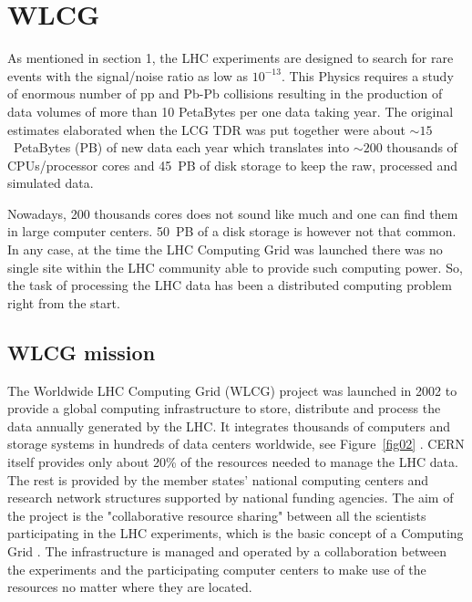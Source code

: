 \section{WLCG}

As mentioned in section 1, the LHC experiments are designed to
search for rare events with the signal/noise ratio as low
as $10^{-13}$. This Physics requires a study of enormous number of
pp and Pb-Pb collisions resulting in the production of data volumes
of more than 10 PetaBytes per one data taking year. The original
estimates elaborated when the LCG TDR \cite{LHC_TDR} was put together were
about $\sim 15$~PetaBytes (PB) of new data each year which
translates into $\sim 200$ thousands of CPUs/processor cores and
45~PB of disk storage to keep the raw, processed and simulated data.

Nowadays, 200 thousands cores does not sound like much and one can
find them in large computer centers. 50~PB of a disk storage is
however not that common. In any case, at the time the LHC Computing
Grid was launched there was no single site within the LHC community
able to provide such computing power. So, the task of
processing the LHC data has been a distributed computing problem
right from the start.

\subsection{WLCG mission}
%
The Worldwide LHC Computing Grid (WLCG) project was launched in
2002 to provide a global computing infrastructure to store,
distribute and process the data annually generated by the LHC.
It integrates thousands of computers and storage systems
in hundreds of data centers worldwide, see Figure~\ref{fig02} . CERN
itself provides only about 20\% of the resources needed to manage
the LHC data. The rest is provided by the member states' national
computing centers and research network structures supported by
national funding agencies. The aim of the project is the
"collaborative resource sharing" between all the scientists
participating in the LHC experiments, which is the basic concept of
a Computing Grid \cite{GRID}. The infrastructure is managed
and operated by a collaboration between the experiments and the
participating computer centers to make use of the resources no
matter where they are located.

